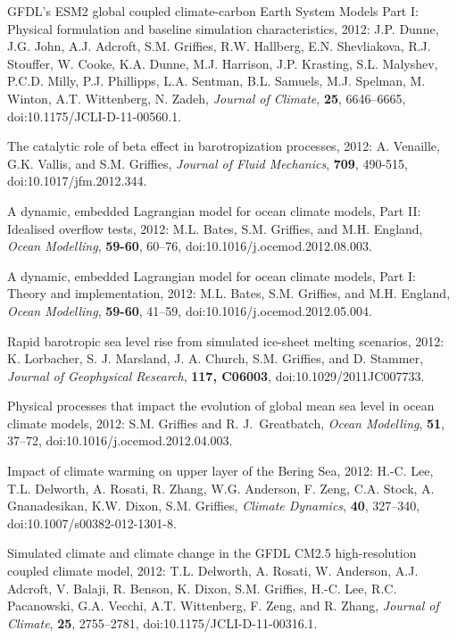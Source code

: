 \begin{etaremune}
\item GFDL’s ESM2 global coupled climate-carbon Earth System Models Part I: Physical formulation and baseline simulation
  characteristics, 2012: J.P. Dunne, J.G. John, A.J. Adcroft, S.M. Grif\/f\/ies, R.W. Hallberg, E.N. Shevliakova, R.J. Stouffer,
  W. Cooke, K.A. Dunne, M.J. Harrison, J.P. Krasting, S.L. Malyshev, P.C.D. Milly, P.J. Phillipps, L.A. Sentman, B.L. Samuels,
  M.J. Spelman, M. Winton, A.T. Wittenberg, N. Zadeh, {\it Journal of Climate}, {\bf 25}, 6646--6665, doi:10.1175/JCLI-D-11-00560.1.

\item The catalytic role of beta effect in barotropization processes,
  2012: A. Venaille, G.K. Vallis, and S.M. Grif\/f\/ies, {\it
    Journal of Fluid Mechanics}, {\bf 709}, 490-515,
  doi:10.1017/jfm.2012.344.

\item A dynamic, embedded Lagrangian model for ocean climate models,
  Part II: Idealised overflow tests, 2012: M.L. Bates, S.M. Grif\/f\/ies, and M.H. England, {\it Ocean Modelling}, {\bf
    59-60}, 60--76, doi:10.1016/j.ocemod.2012.08.003.

\item A dynamic, embedded Lagrangian model for ocean climate models,
  Part I: Theory and implementation, 2012: M.L. Bates, S.M. Grif\/f\/ies, and M.H. England, {\it Ocean Modelling}, {\bf
    59-60}, 41--59, doi:10.1016/j.ocemod.2012.05.004.

\item Rapid barotropic sea level rise from simulated ice-sheet melting
  scenarios, 2012: K. Lorbacher, S. J. Marsland, J. A. Church, S.M. Grif\/f\/ies, and D. Stammer, {\it Journal of Geophysical
    Research}, {\bf 117, C06003}, doi:10.1029/2011JC007733.

\item Physical processes that impact the evolution of global mean sea
  level in ocean climate models, 2012: S.M. Grif\/f\/ies and R. J.\
  Greatbatch, {\it Ocean Modelling}, {\bf 51}, 37--72,
  doi:10.1016/j.ocemod.2012.04.003.

\item Impact of climate warming on upper layer of the Bering Sea,
  2012: H.-C. Lee, T.L. Delworth, A. Rosati, R. Zhang, W.G. Anderson,
  F. Zeng, C.A. Stock, A. Gnanadesikan, K.W. Dixon, S.M. Grif\/f\/ies, {\it Climate Dynamics}, {\bf 40}, 327–340,
\\  doi:10.1007/s00382-012-1301-8.

\item Simulated climate and climate change in the GFDL CM2.5
  high-resolution coupled climate model, 2012: T.L. Delworth,
  A. Rosati, W. Anderson, A.J. Adcroft, V. Balaji, R. Benson,
  K. Dixon, S.M. Grif\/f\/ies, H.-C. Lee, R.C. Pacanowski,
  G.A. Vecchi, A.T. Wittenberg, F. Zeng, and R. Zhang, {\it Journal of
    Climate}, {\bf 25}, 2755--2781, doi:10.1175/JCLI-D-11-00316.1.


\end{etaremune}

